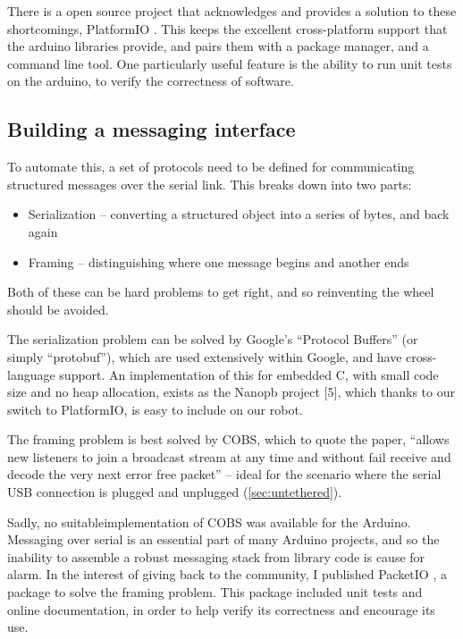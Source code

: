 \documentclass[main.tex]{subfiles}
\begin{document}
	There is a open source project that acknowledges and provides a solution to these shortcomings, PlatformIO \cite{platformio}.
	This keeps the excellent cross-platform support that the arduino libraries provide, and pairs them with a package manager, and a command line tool.
	One particularly useful feature is the ability to run unit tests on the arduino, to verify the correctness of software.



\subsection{Building a messaging interface}

	To automate this, a set of protocols need to be defined for communicating structured messages over the serial link.
	This breaks down into two parts:
	\begin{itemize}
		\item Serialization – converting a structured object into a series of bytes, and back again
		\item Framing – distinguishing where one message begins and another ends
	\end{itemize}
	Both of these can be hard problems to get right, and so reinventing the wheel should be avoided.

	The serialization problem can be solved by Google’s \enquote{Protocol Buffers}\cite{protobuf} (or simply \enquote{protobuf}), which are used extensively within Google, and have cross-language support. An implementation of this for embedded C, with small code size and no heap allocation, exists as the Nanopb project [5], which thanks to our switch to PlatformIO, is easy to include on our robot.

	The framing problem is best solved by COBS\cite{cobs}, which to quote the paper, \enquote{allows new listeners to join a broadcast stream at any time and without fail receive and decode the very next error free packet} – ideal for the scenario where the serial USB connection is plugged and unplugged (\cref{sec:untethered}).

	Sadly, no suitable\footnotemark implementation of COBS was available for the Arduino.
	Messaging over serial is an essential part of many Arduino projects, and so the inability to assemble a robust messaging stack from library code is cause for alarm.
	In the interest of giving back to the community, I published PacketIO \cite{packetio}, a package to solve the framing problem.
	This package included unit tests and online documentation, in order to help verify its correctness and encourage its use.


\bib
\end{document}
